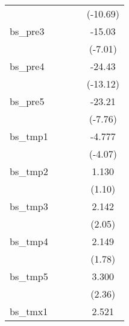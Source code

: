\begin{tabular}{l*{4}{c}}
            &                     &                     &                     &    (-10.69)         \\
[1em]
bs\_pre3     &                     &                     &                     &      -15.03\sym{***}\\
            &                     &                     &                     &     (-7.01)         \\
[1em]
bs\_pre4     &                     &                     &                     &      -24.43\sym{***}\\
            &                     &                     &                     &    (-13.12)         \\
[1em]
bs\_pre5     &                     &                     &                     &      -23.21\sym{***}\\
            &                     &                     &                     &     (-7.76)         \\
[1em]
bs\_tmp1     &                     &                     &                     &      -4.777\sym{***}\\
            &                     &                     &                     &     (-4.07)         \\
[1em]
bs\_tmp2     &                     &                     &                     &       1.130         \\
            &                     &                     &                     &      (1.10)         \\
[1em]
bs\_tmp3     &                     &                     &                     &       2.142\sym{*}  \\
            &                     &                     &                     &      (2.05)         \\
[1em]
bs\_tmp4     &                     &                     &                     &       2.149         \\
            &                     &                     &                     &      (1.78)         \\
[1em]
bs\_tmp5     &                     &                     &                     &       3.300\sym{*}  \\
            &                     &                     &                     &      (2.36)         \\
[1em]
bs\_tmx1     &                     &                     &                     &       2.521         \\

\end{tabular}
